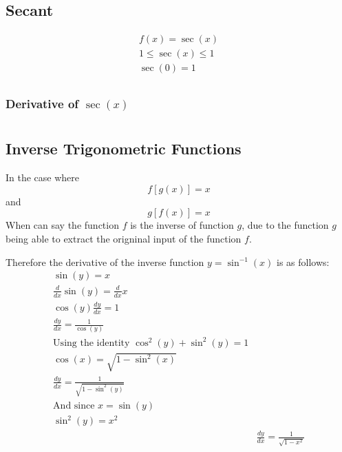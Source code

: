 \documentclass[12pt letter]{report}
\begin{document}
\section{Secant}

\begin{align*}
	f(x) = \sec(x)               \\
	1 \leq        \sec(x) \leq 1 \\
	\sec(0) = 1                  \\
\end{align*}

\subsection{Derivative of $\sec(x)$}

\chapter{}

\section{Inverse Trigonometric Functions}
In the case where
\[
	f[g(x)] = x
\] and
\[
	g[f(x)] = x
\]
When can say the function $f$ is the inverse of function $g$, due to the function $g$ being able to extract the origninal input of the function $f$.

Therefore the derivative of the inverse function $y = \sin^{-1}(x)$ is as follows:
\begin{align*}
	\sin(y) = x                                          \\
	\frac{d}{dx}\sin(y) = \frac{d}{dx} x                 \\
	\cos(y)\frac{dy}{dx} = 1                             \\
	\frac{dy}{dx} = \frac{1}{\cos(y)}                    \\[20pt]
	\text{Using the identity } \cos^2(y) + \sin^2(y) = 1 \\
	\cos(x) = \sqrt{1 - \sin^2(x)}                       \\
	\frac{dy}{dx} = \frac{1}{\sqrt{1 - \sin^2(y)}}       \\
	\text{And since } x = \sin(y)                        \\
	\sin^2(y) = x^2                                      \\
	 & \frac{dy}{dx} = \frac{1}{\sqrt{1 - x^2}}          \\
\end{align*}
\end{document}
